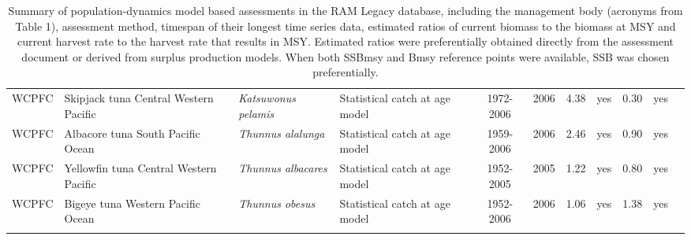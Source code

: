 \begin{longtable}{p{1.8cm}p{3.5cm}p{3.5cm}p{3cm}cccp{0.9cm}cp{0.9cm}c}
  WCPFC & Skipjack tuna Central Western Pacific & \textit{Katsuwonus pelamis} & Statistical catch at age model & 1972-2006 & 2006 & 4.38 & yes & 0.30 & yes & \cite{SC4-SA-WP4-SKJ-Assessment-rev1-skipjack.pdf} \\ 
  WCPFC & Albacore tuna South Pacific Ocean & \textit{Thunnus alalunga} & Statistical catch at age model & 1959-2006 & 2006 & 2.46 & yes & 0.90 & yes & \cite{JENSEN_ALBWPO_2008.pdf} \\ 
  WCPFC & Yellowfin tuna Central Western Pacific & \textit{Thunnus albacares} & Statistical catch at age model & 1952-2005 & 2005 & 1.22 & yes & 0.80 & yes & \cite{WCPFC-SC3-SA-SWG-WP-01.pdf} \\ 
  WCPFC & Bigeye tuna Western Pacific Ocean & \textit{Thunnus obesus} & Statistical catch at age model & 1952-2006 & 2006 & 1.06 & yes & 1.38 & yes & \cite{SC4-SA-WP1-rev1-bigeye-tuna.pdf} \\ 
   \hline
\hline
\caption{Summary of population-dynamics model based assessments in the RAM Legacy database, including the management body (acronyms from Table 1), assessment method, timespan of their longest time series data, estimated ratios of current biomass to the biomass at MSY and current harvest rate to the harvest rate that results in MSY. Estimated ratios were preferentially obtained directly from the assessment document or derived from surplus production models. When both SSBmsy and Bmsy reference points were available, SSB was chosen preferentially.}
\label{tab:crosshair}
\end{longtable}
